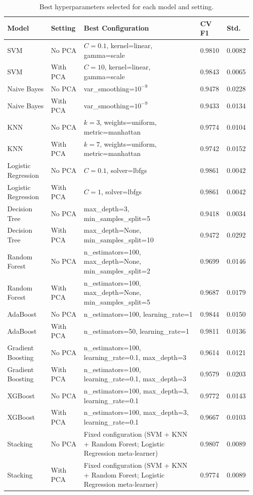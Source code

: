 \documentclass[12pt,a4paper]{article}
\begin{document}
\begin{longtable}{|p{3.0cm}|p{1.4cm}|p{9.0cm}|p{1.4cm}|p{1.4cm}|}
\caption{Best hyperparameters selected for each model and setting.}\\
\hline
\textbf{Model} & \textbf{Setting} & \textbf{Best Configuration} & \textbf{CV F1} & \textbf{Std.}\\ \hline
SVM & No PCA & $C=0.1$, kernel=linear, gamma=scale & 0.9810 & 0.0082 \\
SVM & With PCA & $C=10$, kernel=linear, gamma=scale & 0.9843 & 0.0065 \\
Naive Bayes & No PCA & var\_smoothing=$10^{-9}$ & 0.9478 & 0.0228 \\
Naive Bayes & With PCA & var\_smoothing=$10^{-9}$ & 0.9433 & 0.0134 \\
KNN & No PCA & $k=3$, weights=uniform, metric=manhattan & 0.9774 & 0.0104 \\
KNN & With PCA & $k=7$, weights=uniform, metric=manhattan & 0.9742 & 0.0152 \\
Logistic Regression & No PCA & $C=0.1$, solver=lbfgs & 0.9861 & 0.0042 \\
Logistic Regression & With PCA & $C=1$, solver=lbfgs & 0.9861 & 0.0042 \\
Decision Tree & No PCA & max\_depth=3, min\_samples\_split=5 & 0.9418 & 0.0034 \\
Decision Tree & With PCA & max\_depth=None, min\_samples\_split=10 & 0.9472 & 0.0292 \\
Random Forest & No PCA & n\_estimators=100, max\_depth=None, min\_samples\_split=2 & 0.9699 & 0.0146 \\
Random Forest & With PCA & n\_estimators=100, max\_depth=None, min\_samples\_split=5 & 0.9687 & 0.0179 \\
AdaBoost & No PCA & n\_estimators=100, learning\_rate=1 & 0.9844 & 0.0150 \\
AdaBoost & With PCA & n\_estimators=50, learning\_rate=1 & 0.9811 & 0.0136 \\
Gradient Boosting & No PCA & n\_estimators=100, learning\_rate=0.1, max\_depth=3 & 0.9614 & 0.0121 \\
Gradient Boosting & With PCA & n\_estimators=100, learning\_rate=0.1, max\_depth=3 & 0.9579 & 0.0203 \\
XGBoost & No PCA & n\_estimators=100, max\_depth=3, learning\_rate=0.1 & 0.9772 & 0.0143 \\
XGBoost & With PCA & n\_estimators=100, max\_depth=3, learning\_rate=0.1 & 0.9667 & 0.0103 \\
Stacking & No PCA & Fixed configuration (SVM + KNN + Random Forest; Logistic Regression meta-learner) & 0.9807 & 0.0089 \\
Stacking & With PCA & Fixed configuration (SVM + KNN + Random Forest; Logistic Regression meta-learner) & 0.9774 & 0.0089 \\
\hline
\end{longtable}
\end{document}
